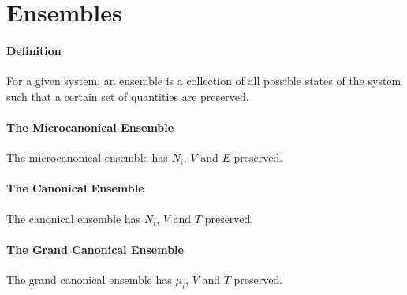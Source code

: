 \section{Ensembles}

\paragraph{Definition}
For a given system, an ensemble is a collection of all possible states of the system such that a certain set of quantities are preserved.

\paragraph{The Microcanonical Ensemble}
The microcanonical ensemble has $N_{i}$, $V$ and $E$ preserved.

\paragraph{The Canonical Ensemble}
The canonical ensemble has $N_{i}$, $V$ and $T$ preserved.

\paragraph{The Grand Canonical Ensemble}
The grand canonical ensemble has $\mu_{i}$, $V$ and $T$ preserved.